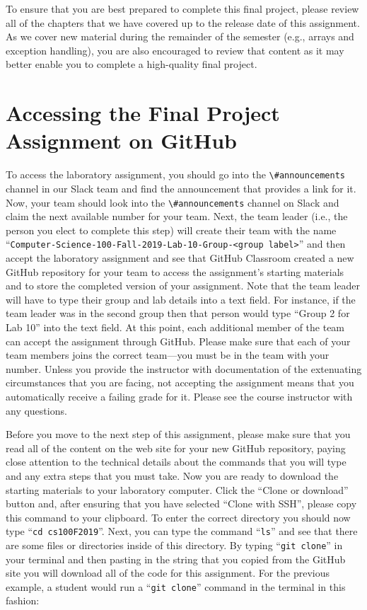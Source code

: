 \documentclass[11pt]{article}
\newcommand{\command}[1]{``\lstinline{#1}''}
\newcommand{\channel}[1]{\lstinline{#1}}
\begin{document}
To ensure that you are best prepared to complete this final project, please
review all of the chapters that we have covered up to the release date of this
assignment. As we cover new material during the remainder of the semester (e.g.,
arrays and exception handling), you are also encouraged to review that content
as it may better enable you to complete a high-quality final project.

\section*{Accessing the Final Project Assignment on GitHub}

To access the laboratory assignment, you should go into the
\channel{\#announcements} channel in our Slack team and find the announcement
that provides a link for it. Now, your team should look into the
\channel{\#announcements} channel on Slack and claim the next available number
for your team. Next, the team leader (i.e., the person you elect to complete
this step) will create their team with the name
\command{Computer-Science-100-Fall-2019-Lab-10-Group-<group label>} and then
accept the laboratory assignment and see that GitHub Classroom created a new
GitHub repository for your team to access the assignment's starting materials
and to store the completed version of your assignment. Note that the team leader
will have to type their group and lab details into a text field. For instance,
if the team leader was in the second group then that person would type ``Group 2
for Lab 10'' into the text field. At this point, each additional member of the
team can accept the assignment through GitHub. Please make sure that each of
your team members joins the correct team---you must be in the team with your
number. Unless you provide the instructor with documentation of the extenuating
circumstances that you are facing, not accepting the assignment means that you
automatically receive a failing grade for it. Please see the course instructor
with any questions.

Before you move to the next step of this assignment, please make sure that you
read all of the content on the web site for your new GitHub repository, paying
close attention to the technical details about the commands that you will type
and any extra steps that you must take. Now you are ready to download the
starting materials to your laboratory computer. Click the ``Clone or download''
button and, after ensuring that you have selected ``Clone with SSH'', please
copy this command to your clipboard. To enter the correct directory you should
now type \command{cd cs100F2019}. Next, you can type the command \command{ls}
and see that there are some files or directories inside of this directory. By
typing \command{git clone} in your terminal and then pasting in the string that
you copied from the GitHub site you will download all of the code for this
assignment. For the previous example, a student would run a \command{git clone}
command in the terminal in this fashion:
\end{document}
